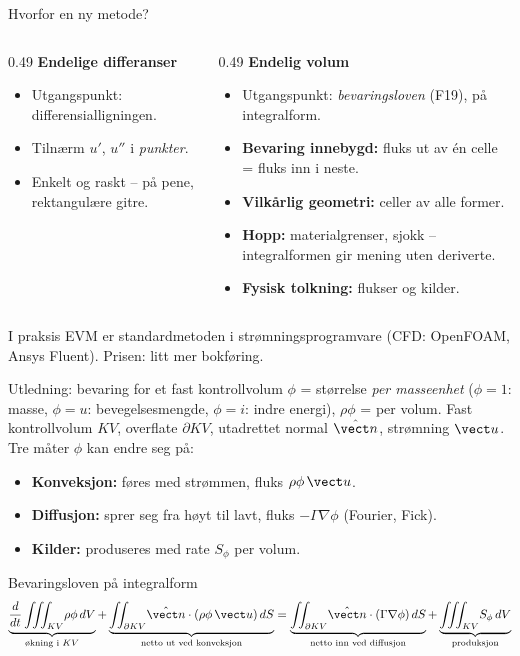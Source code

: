 \documentclass[11pt,aspectratio=169]{beamer}
\begin{document}
\begin{frame}{Hvorfor en ny metode?}
\begin{columns}[T]
\begin{column}{0.49\textwidth}
\textbf{Endelige differanser}
\begin{itemize}
\item Utgangspunkt: differensialligningen.
\item Tilnærm $u'$, $u''$ i \emph{punkter}.
\item Enkelt og raskt -- på pene, rektangulære gitre.
\end{itemize}
\end{column}
\begin{column}{0.49\textwidth}
\textbf{Endelig volum}
\begin{itemize}\small
\item Utgangspunkt: \emph{bevaringsloven} (F19), på integralform.
\item \textbf{Bevaring innebygd:} fluks ut av én celle = fluks inn i neste.
\item \textbf{Vilkårlig geometri:} celler av alle former.
\item \textbf{Hopp:} materialgrenser, sjokk -- integralformen gir mening uten deriverte.
\item \textbf{Fysisk tolkning:} flukser og kilder.
\end{itemize}
\end{column}
\end{columns}
\vspace{0.3em}
\begin{remb}{I praksis}
\small EVM er standardmetoden i strømningsprogramvare (CFD: OpenFOAM, Ansys Fluent). Prisen: litt mer bokføring.
\end{remb}
\end{frame}

\begin{frame}{Utledning: bevaring for et fast kontrollvolum}
$\phi$ = størrelse \emph{per masseenhet} ($\phi=1$: masse, $\phi=u$: bevegelsesmengde, $\phi=i$: indre energi), $\rho\phi$ = per volum. Fast kontrollvolum $KV$, overflate $\partial KV$, utadrettet normal $\hat{\vect n}$, strømning $\vect u$. Tre måter $\phi$ kan endre seg på:
\begin{itemize}
\item \textbf{Konveksjon:} føres med strømmen, fluks $\rho\phi\,\vect u$.
\item \textbf{Diffusjon:} sprer seg fra høyt til lavt, fluks $-\Gamma\nabla\phi$ (Fourier, Fick).
\item \textbf{Kilder:} produseres med rate $S_\phi$ per volum.
\end{itemize}
\begin{oppsumb}{Bevaringsloven på integralform}
\small
\[
\underbrace{\frac{d}{dt}\iiint_{KV}\!\rho\phi\,dV}_{\text{økning i } KV}
+ \underbrace{\iint_{\partial KV}\!\hat{\vect n}\cdot(\rho\phi\,\vect u)\,dS}_{\text{netto ut ved konveksjon}}
= \underbrace{\iint_{\partial KV}\!\hat{\vect n}\cdot(\Gamma\nabla\phi)\,dS}_{\text{netto inn ved diffusjon}}
+ \underbrace{\iiint_{KV}\!S_\phi\,dV}_{\text{produksjon}}
\]
\end{oppsumb}
\end{frame}
\end{document}
